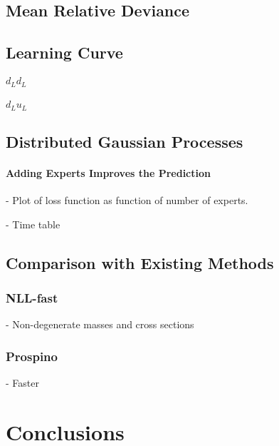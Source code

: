 \documentclass[twoside,english]{uiofysmaster}
\begin{document}
\section{Mean Relative Deviance}


\section{Learning Curve}

\subsubsection{$d_Ld_L$}

\subsubsection{$d_Lu_L$}

\section{Distributed Gaussian Processes}

\subsubsection{Adding Experts Improves the Prediction}

- Plot of loss function as function of number of experts.

- Time table

\section{Comparison with Existing Methods}

\subsection{NLL-fast}

- Non-degenerate masses and cross sections

\subsection{Prospino}

- Faster



\chapter{Conclusions}
\end{document}
